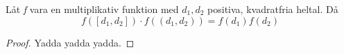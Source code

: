 \begin{lemma}
Låt \textit{f} vara en multiplikativ funktion med \(d_1,d_2\) positiva, kvadratfria heltal. Då
\begin{equation}
    f([d_1,d_2])\cdot f((d_1, d_2)) = f(d_1)f(d_2)\nonumber
\end{equation}
\end{lemma}
\begin{proof}
Yadda yadda yadda.
\end{proof}